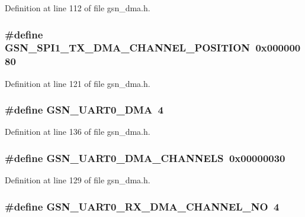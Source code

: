 Definition at line 112 of file gsn\_\-dma.h.

\hypertarget{a00484_a433e53beca3e8fd24635b491bfa2aa19}{
\subsubsection[{GSN\_\-SPI1\_\-TX\_\-DMA\_\-CHANNEL\_\-POSITION}]{\setlength{\rightskip}{0pt plus 5cm}\#define GSN\_\-SPI1\_\-TX\_\-DMA\_\-CHANNEL\_\-POSITION~0x00000080}}
\label{a00484_a433e53beca3e8fd24635b491bfa2aa19}


Definition at line 121 of file gsn\_\-dma.h.

\hypertarget{a00484_a0aec9c64944acaf248ad1dd7cee8c937}{
\subsubsection[{GSN\_\-UART0\_\-DMA}]{\setlength{\rightskip}{0pt plus 5cm}\#define GSN\_\-UART0\_\-DMA~4}}
\label{a00484_a0aec9c64944acaf248ad1dd7cee8c937}


Definition at line 136 of file gsn\_\-dma.h.

\hypertarget{a00484_afcbc9006c931ac89b672bae0b187f309}{
\subsubsection[{GSN\_\-UART0\_\-DMA\_\-CHANNELS}]{\setlength{\rightskip}{0pt plus 5cm}\#define GSN\_\-UART0\_\-DMA\_\-CHANNELS~0x00000030}}
\label{a00484_afcbc9006c931ac89b672bae0b187f309}


Definition at line 129 of file gsn\_\-dma.h.

\hypertarget{a00484_a36502973cc3d1fdac5fdf844245d5c41}{
\subsubsection[{GSN\_\-UART0\_\-RX\_\-DMA\_\-CHANNEL\_\-NO}]{\setlength{\rightskip}{0pt plus 5cm}\#define GSN\_\-UART0\_\-RX\_\-DMA\_\-CHANNEL\_\-NO~4}}
\label{a00484_a36502973cc3d1fdac5fdf844245d5c41}


